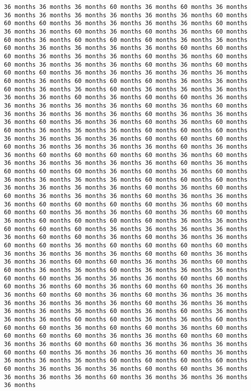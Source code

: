 \documentclass[11pt]{article}
\begin{document}
\begin{Verbatim}[commandchars=\\\{\}, frame=single, framerule=2mm, rulecolor=\color{outerrorbackground}]
36 months 36 months 36 months 60 months 36 months 60 months 36 months 36 months 36 months 36 months 36 months 36 months 36 months 60 months 60 months 60 months 36 months 36 months 36 months 36 months 60 months 36 months 36 months 60 months 36 months 60 months 36 months 60 months 60 months 36 months 60 months 60 months 60 months 36 months 36 months 60 months 36 months 36 months 36 months 36 months 60 months 60 months 60 months 36 months 36 months 36 months 60 months 36 months 60 months 60 months 36 months 36 months 36 months 60 months 36 months 60 months 60 months 60 months 36 months 36 months 36 months 36 months 36 months 60 months 36 months 60 months 60 months 60 months 36 months 36 months 60 months 36 months 36 months 60 months 36 months 36 months 36 months 36 months 36 months 60 months 36 months 60 months 60 months 36 months 36 months 36 months 36 months 36 months 60 months 36 months 60 months 36 months 36 months 36 months 36 months 60 months 36 months 36 months 36 months 60 months 36 months 36 months 60 months 36 months 60 months 60 months 36 months 36 months 36 months 60 months 60 months 60 months 36 months 36 months 36 months 36 months 60 months 60 months 60 months 60 months 36 months 36 months 36 months 36 months 60 months 36 months 36 months 60 months 60 months 60 months 60 months 36 months 60 months 36 months 36 months 36 months 36 months 36 months 60 months 36 months 60 months 60 months 60 months 36 months 60 months 36 months 60 months 36 months 36 months 36 months 36 months 60 months 60 months 60 months 36 months 36 months 36 months 36 months 60 months 36 months 60 months 60 months 36 months 36 months 36 months 60 months 36 months 36 months 36 months 60 months 60 months 60 months 60 months 36 months 60 months 60 months 60 months 36 months 36 months 60 months 36 months 60 months 36 months 60 months 60 months 60 months 60 months 36 months 36 months 60 months 60 months 60 months 36 months 36 months 36 months 36 months 36 months 60 months 60 months 36 months 60 months 36 months 36 months 60 months 60 months 36 months 60 months 60 months 60 months 60 months 36 months 36 months 36 months 36 months 60 months 60 months 36 months 36 months 36 months 60 months 60 months 36 months 36 months 60 months 60 months 36 months 36 months 60 months 36 months 36 months 36 months 60 months 60 months 36 months 36 months 36 months 60 months 60 months 60 months 36 months 60 months 36 months 60 months 60 months 36 months 36 months 60 months 60 months 36 months 60 months 36 months 36 months 36 months 36 months 36 months 36 months 60 months 36 months 36 months 36 months 36 months 36 months 60 months 36 months 60 months 36 months 36 months 36 months 60 months 60 months 36 months 36 months 60 months 60 months 60 months 36 months 60 months 60 months 36 months 60 months 60 months 60 months 60 months 36 months 36 months 60 months 60 months 36 months 36 months 60 months 60 months 36 months 36 months 36 months 60 months 60 months 36 months 36 months 36 months 60 months 36 months 36 months 36 months 36 months 60 months 60 months 60 months 60 months 60 months 36 months 36 months 36 months 60 months 60 months 36 months 36 months 36 months 36 months 60 months 36 months 36 months 36 months 36 months 
\end{Verbatim}
\end{document}
